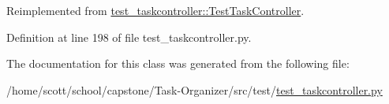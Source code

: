 \hypertarget{classtest__taskcontroller_1_1TestTaskControllerGTaskStorage_afac8474c0938bce8e9ffa5c809d65e7a}{
\subsubsection[{title}]{}}
\label{classtest__taskcontroller_1_1TestTaskControllerGTaskStorage_afac8474c0938bce8e9ffa5c809d65e7a}


\-Reimplemented from \hyperlink{classtest__taskcontroller_1_1TestTaskController_a450431cde03f14169cd5ac04db704ab6}{test\-\_\-taskcontroller\-::\-Test\-Task\-Controller}.



\-Definition at line 198 of file test\-\_\-taskcontroller.\-py.



\-The documentation for this class was generated from the following file\-:\begin{DoxyCompactItemize}
\item 
/home/scott/school/capstone/\-Task-\/\-Organizer/src/test/\hyperlink{test__taskcontroller_8py}{test\-\_\-taskcontroller.\-py}\end{DoxyCompactItemize}
